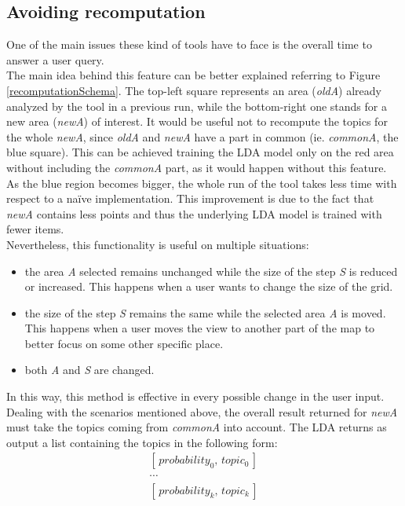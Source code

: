 \documentclass{sig-alternate-05-2015}
\begin{document}
\subsection{Avoiding recomputation}\label{avoidingRecomputation}
One of the main issues these kind of tools have to face is the overall time to answer a user query.\\
The main idea behind this feature can be better explained referring to Figure \ref{recomputationSchema}. The top-left square represents an area (\emph{oldA}) already analyzed by the tool in a previous run, while the bottom-right one stands for a new area (\emph{newA}) of interest. It would be useful not to recompute the topics for the whole \emph{newA}, since \emph{oldA} and \emph{newA} have a part in common (ie. \emph{commonA}, the blue square). This can be achieved training the LDA model only on the red area without including the \emph{commonA} part, as it would happen without this feature. As the blue region becomes bigger, the whole run of the tool takes less time with respect to a na\"{i}ve implementation. This improvement is due to the fact that \emph{newA} contains less points and thus the underlying LDA model is trained with fewer items.\\
Nevertheless, this functionality is useful on multiple situations:
\begin{itemize}
    \item the area \emph{A} selected remains unchanged while the size of the step \emph{S} is reduced or increased. This happens when a user wants to change the size of the grid.
    \item the size of the step \emph{S} remains the same while the selected area \emph{A} is moved. This happens when a user moves the view to another part of the map to better focus on some other specific place.
    \item both \emph{A} and \emph{S} are changed.
\end{itemize}
In this way, this method is effective in every possible change in the user input.\\
Dealing with the scenarios mentioned above, the overall result returned for \emph{newA} must take the topics coming from \emph{commonA} into account. The LDA returns as output a list containing the topics in the following form:
\begin{equation}
    \begin{split}
        [\,probability_0,\,topic_0\,] \\
        \cdots \\
        [\,probability_k,\,topic_k\,]
    \end{split}
\end{equation}
\end{document}
